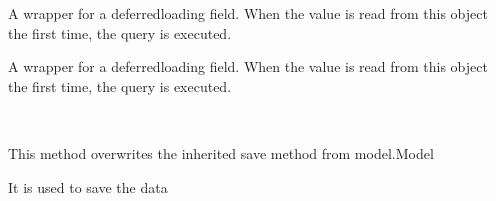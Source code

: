 \documentclass[letterpaper,10pt,english]{sphinxmanual}
\begin{document}
\begin{fulllineitems}
\begin{fulllineitems}
\end{fulllineitems}


\begin{fulllineitems}
\label{\detokenize{users:users.models.UserProfile.identity}}
\sphinxAtStartPar
A wrapper for a deferred\sphinxhyphen{}loading field. When the value is read from this
object the first time, the query is executed.

\end{fulllineitems}


\begin{fulllineitems}
\label{\detokenize{users:users.models.UserProfile.objects}}
\end{fulllineitems}


\begin{fulllineitems}
\label{\detokenize{users:users.models.UserProfile.roll_no}}
\sphinxAtStartPar
A wrapper for a deferred\sphinxhyphen{}loading field. When the value is read from this
object the first time, the query is executed.

\end{fulllineitems}


\begin{fulllineitems}
\label{\detokenize{users:users.models.UserProfile.save}}~
\begin{DUlineblock}{0em}
\item[] This method overwrites the inherited save method from model.Model
\item[] It is used to save the data
\end{DUlineblock}


\end{fulllineitems}
\end{fulllineitems}
\end{document}
